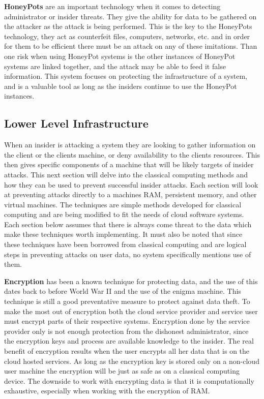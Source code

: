 \label{hlHoneyPots}

\textbf{HoneyPots} are an important technology when it comes to detecting administrator or insider threats. They give the ability for data to be gathered on the attacker as the attack is being performed. This is the key to the HoneyPots technology, they act as counterfeit files, computers, networks, etc. and in order for them to be efficient there must be an attack on any of these imitations. \cite{spitzner} Than one risk when using HoneyPot systems is the other instances of HoneyPot systems are linked together, and the attack may be able to feed it false information. This system focuses on protecting the infrastructure of a system, and is a valuable tool as long as the insiders continue to use the HoneyPot instances.  \cite{spitzner}

\subsection{Lower Level Infrastructure}
\label{llInfrastructure}

When an insider is attacking a system they are looking to gather information on the client or the clients machine, or deny availability to the clients resources. \cite{kandias} This then gives specific components of a machine that will be likely targets of insider attacks. This next section will delve into the classical computing methods and how they can be used to prevent successful insider attacks. Each section will look at preventing attacks directly to a machines RAM, persistent memory, and other virtual machines. The techniques are simple methods developed for classical computing and are being modified to fit the needs of cloud software systems. Each section below assumes that there is always come threat to the data which make these techniques worth implementing. It must also be noted that since these techniques have been borrowed from classical computing and are logical steps in preventing attacks on user data, no system specifically mentions use of them. \cite{szefer}

\label{llEncryption}

\textbf{Encryption} has been a known technique for protecting data, and the use of this dates back to before World War II and the use of the enigma machine. This technique is still a good preventative measure to protect against data theft. To make the most out of encryption both the cloud service provider and service user must encrypt parts of their respective systems. \cite{kandias} Encryption done by the service provider only is not enough protection from the dishonest administrator, since the encryption keys and process are available knowledge to the insider. The real benefit of encryption results when the user encrypts all her data that is on the cloud hosted services. \cite{kandias} As long as the encryption key is stored only on a non-cloud user machine the encryption will be just as safe as on a classical computing device. The downside to work with encrypting data is that it is computationally exhaustive, especially when working with the encryption of RAM. \cite{szefer}

